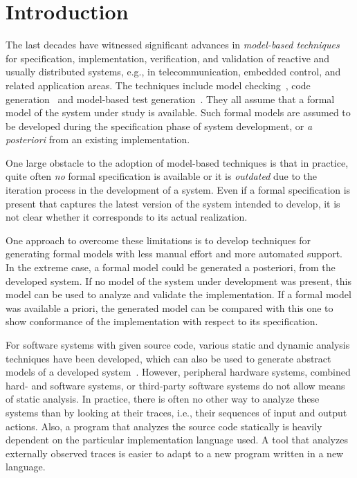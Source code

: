 \section{Introduction}

The last decades have witnessed significant advances in {\em
  model-based techniques} for specification, implementation,
verification, and validation of reactive and usually distributed
systems, e.g., in telecommunication, embedded control, and related
application areas. The techniques include model
checking~\cite{Uppaal:nutshell,SPIN}, code
generation~\cite{Harel:statemate} and model-based test
generation~\cite{FJJV:scp97,SEG:testtools}.  They all assume that a
formal model of the system under study is available.  Such formal
models are assumed to be developed during the specification phase of
system development, or {\em a posteriori} from an existing
implementation.

One large obstacle to the adoption of model-based techniques is that
in practice, quite often \emph{no} formal specification is
available or it is \emph{outdated} due to the iteration process in the
development of a system. Even if a formal specification is present
that captures the latest version of the system intended to develop, it
is not clear whether it corresponds to its actual realization. 

One approach to overcome these limitations is to develop techniques
for generating formal models with less manual effort and more automated
support. In the extreme case, a formal model could be generated
a posteriori, from the developed system. If no model of the
system under development was present, this model can be used to
analyze and validate the implementation. If a formal model was
available a priori, the generated model can be compared with this one
to show conformance of the implementation with respect to its
specification.

For software systems with given source code, various static and
dynamic analysis techniques have been developed, which can also be used
to generate abstract models of a developed
system~\cite{Cetal:bandera,Holzmann:spin00}.
However, peripheral hardware systems, combined
hard- and software systems, or third-party software systems do not
allow means of static analysis. In practice, there is often no other
way to analyze these systems than by looking at their traces, i.e., 
their sequences of input and output actions.  Also, a program that
analyzes the source code statically is heavily dependent on the
particular implementation language used. A tool that analyzes
externally observed traces is easier to adapt to a new program written
in a new language.

